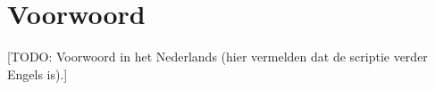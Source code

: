 \chapter*{Voorwoord}

[TODO: Voorwoord in het Nederlands (hier vermelden dat de scriptie verder Engels is).]

\cleardoublepage